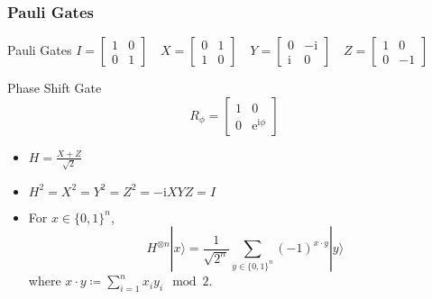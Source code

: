 \documentclass[UTF8,11pt,colorlinks,compress,openany]{beamer}%
\begin{document}
\begin{frame}\frametitle{Pauli Gates}
\setlength\abovedisplayskip{0pt}
\setlength\belowdisplayskip{0pt}
\begin{block}{Pauli Gates}
$I = \begin{bmatrix} 1 & 0 \\ 0 & 1\end{bmatrix}\quad
X = \begin{bmatrix} 0 & 1 \\ 1 & 0\end{bmatrix}\quad
Y = \begin{bmatrix} 0 & -\mathrm{i} \\ \mathrm{i} & 0\end{bmatrix}\quad
Z = \begin{bmatrix} 1 & 0 \\ 0 & -1\end{bmatrix}$
\end{block}
\begin{block}{Phase Shift Gate}
	\[R_{\phi}=
	\begin{bmatrix}
	1&0\\
	0&\mathrm{e}^{\mathrm{i}\phi}
	\end{bmatrix}\]
\end{block}
\begin{itemize}
	\item $H=\frac{X+Z}{\sqrt{2}}$
	\item $H^2=X^2=Y^2=Z^2=-\mathrm{i}XYZ=I$
	\item For $x\in\{0,1\}^n$,
\[H^{\otimes n}|x\rangle=\frac{1}{\sqrt{2^n}}\sum\limits_{y\in\{0,1\}^n}(-1)^{x\cdot y}|y\rangle\]
where $x\cdot y\coloneqq \sum\limits_{i=1}^n x_iy_i\mod 2$.
\end{itemize}
\end{frame}
\end{document}
